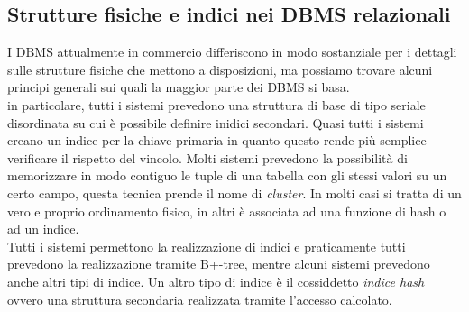\subsection{Strutture fisiche e indici nei DBMS relazionali}
I DBMS attualmente in commercio differiscono in modo sostanziale per i dettagli sulle strutture fisiche che mettono a disposizioni, ma possiamo trovare alcuni principi generali sui quali la maggior parte dei DBMS si basa.\\
in particolare, tutti i sistemi prevedono una struttura di base di tipo seriale disordinata su cui è possibile definire inidici secondari. Quasi tutti i sistemi creano un indice per la chiave primaria in quanto questo rende più semplice verificare il rispetto del vincolo.
Molti sistemi prevedono la possibilità di memorizzare in modo contiguo le tuple di una tabella con gli stessi valori su un certo campo, questa tecnica prende il nome di \emph{cluster}. In molti casi si tratta di un vero e proprio ordinamento fisico, in altri è associata ad una funzione di hash o ad un indice.\\
Tutti i sistemi permettono la realizzazione di indici e praticamente tutti prevedono la realizzazione tramite B+-tree, mentre alcuni sistemi prevedono anche altri tipi di indice. Un altro tipo di indice è il cossiddetto \emph{indice hash} ovvero una struttura secondaria realizzata tramite l'accesso calcolato.
